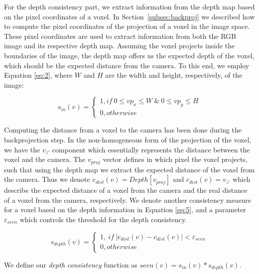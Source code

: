 \documentclass{article}
\begin{document}
For the depth consistency part, we extract information from the depth map based on the pixel coordinates of a voxel. In Section~\ref{subsec:backproj} we described how to compute the pixel coordinates of the projection of a voxel in the image space. These pixel coordinates are used to extract information from both the RGB image and its respective depth map. Assuming the voxel projects inside the boundaries of the image, the depth map offers us the expected depth of the voxel, which should be the expected distance from the camera. To this end, we employ Equation \ref{eq:2}, where \(W\) and \(H\) are the width and height, respectively, of the image:

\begin{equation} \label{eq:2}
s_{in}(v)= \left
\{
\begin{array}{ll}
      1,if\ 0 \leq vp_{x} \leq W\ \& \ 0 \leq vp_{y} \leq H\\
      0, otherwise
\end{array} 
\right. 
\end{equation}

Computing the distance from a voxel to the camera has been done during the backprojection step. In the non-homogeneous form of the projection of the voxel, we have the \(v_{z'}\) component which essentially represents the distance between the voxel and the camera. The \(v_{proj}\) vector defines in which pixel the voxel projects, such that using the depth map we extract the expected distance of the voxel from the camera. Thus we denote $ e_{dist}(v) = Depth[v_{proj}] $ and $ c_{dist}(v) = v_{z'}$ which describe the expected distance of a voxel from the camera and the real distance of a voxel from the camera, respectively. We denote another consistency measure for a voxel based on the depth information in Equation \ref{eq:5}, and a parameter \(\varepsilon_{seen}\) which controls the threshold for the depth consistency.

\begin{equation} \label{eq:5}
s_{depth}(v)= \left\{
\begin{array}{ll}
      1,\ if\ |e_{dist}(v) - c_{dist}(v)| < \varepsilon_{seen}\\
      0, otherwise
\end{array} 
\right.
\end{equation}

We define our \textit{depth consistency} function as $seen(v) = s_{in}(v) * s_{depth}(v)$.
\end{document}
